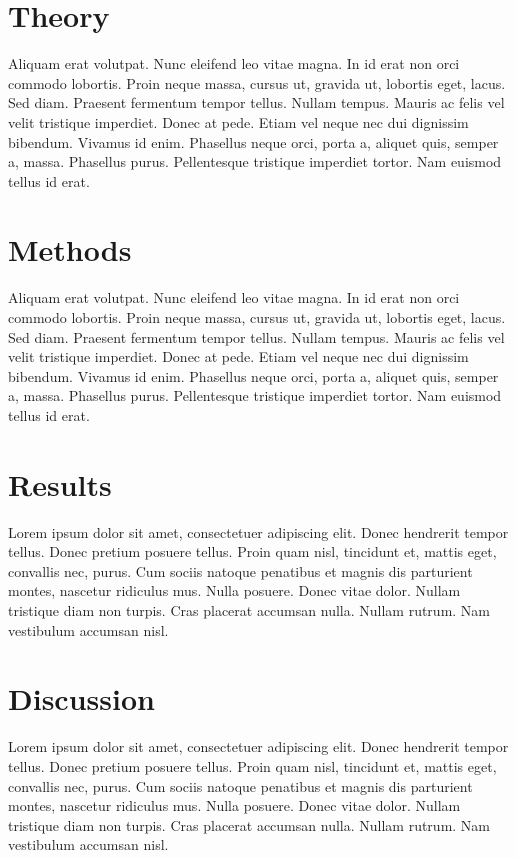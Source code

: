 \documentclass[a4paper,12pt]{article}
\begin{document}
\section{Theory}

Aliquam erat volutpat.  Nunc eleifend leo vitae magna.  In id erat non
orci commodo lobortis.  Proin neque massa, cursus ut, gravida ut,
lobortis eget, lacus.  Sed diam.  Praesent fermentum tempor tellus.
Nullam tempus.  Mauris ac felis vel velit tristique imperdiet.  Donec
at pede.  Etiam vel neque nec dui dignissim bibendum.  Vivamus id
enim.  Phasellus neque orci, porta a, aliquet quis, semper a, massa.
Phasellus purus.  Pellentesque tristique imperdiet tortor.  Nam
euismod tellus id erat.

\section{Methods}

Aliquam erat volutpat.  Nunc eleifend leo vitae magna.  In id erat non
orci commodo lobortis.  Proin neque massa, cursus ut, gravida ut,
lobortis eget, lacus.  Sed diam.  Praesent fermentum tempor tellus.
Nullam tempus.  Mauris ac felis vel velit tristique imperdiet.  Donec
at pede.  Etiam vel neque nec dui dignissim bibendum.  Vivamus id
enim.  Phasellus neque orci, porta a, aliquet quis, semper a, massa.
Phasellus purus.  Pellentesque tristique imperdiet tortor.  Nam
euismod tellus id erat.

\section{Results}

Lorem ipsum dolor sit amet, consectetuer adipiscing elit.  Donec
hendrerit tempor tellus.  Donec pretium posuere tellus.  Proin quam
nisl, tincidunt et, mattis eget, convallis nec, purus.  Cum sociis
natoque penatibus et magnis dis parturient montes, nascetur ridiculus
mus.  Nulla posuere.  Donec vitae dolor.  Nullam tristique diam non
turpis.  Cras placerat accumsan nulla.  Nullam rutrum.  Nam vestibulum
accumsan nisl.

\section{Discussion}

Lorem ipsum dolor sit amet, consectetuer adipiscing elit.  Donec
hendrerit tempor tellus.  Donec pretium posuere tellus.  Proin quam
nisl, tincidunt et, mattis eget, convallis nec, purus.  Cum sociis
natoque penatibus et magnis dis parturient montes, nascetur ridiculus
mus.  Nulla posuere.  Donec vitae dolor.  Nullam tristique diam non
turpis.  Cras placerat accumsan nulla.  Nullam rutrum.  Nam vestibulum
accumsan nisl.
\end{document}
